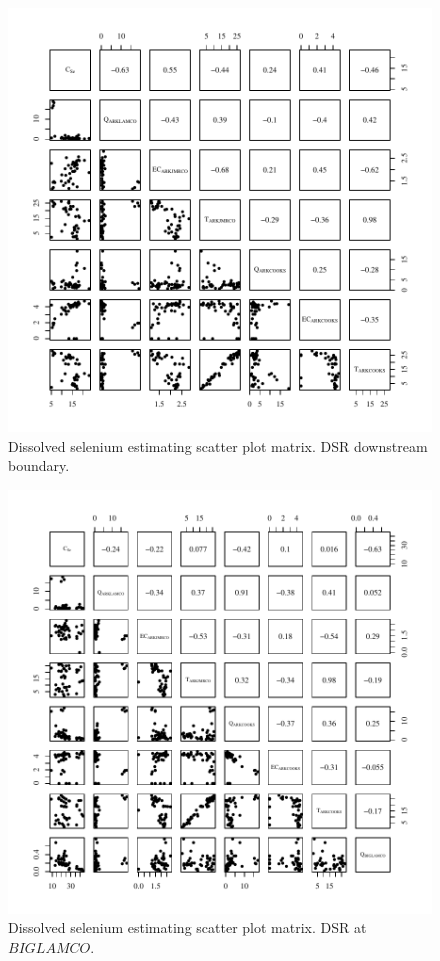 \begin{figure}[htbp]
	\begin{center}
	\includegraphics[width=6in]{"Figures/Results_DSR/Conc Model Full PairsD106C"}
	\caption{Dissolved selenium estimating scatter plot matrix.  DSR downstream boundary.}
	\end{center}
\end{figure}

\begin{figure}[htbp]
	\begin{center}
	\includegraphics[width=6in]{"Figures/Results_DSR/Conc Model Full PairsBIG"}
	\caption{Dissolved selenium estimating scatter plot matrix.  DSR at $BIGLAMCO$.}
	\end{center}
\end{figure}

